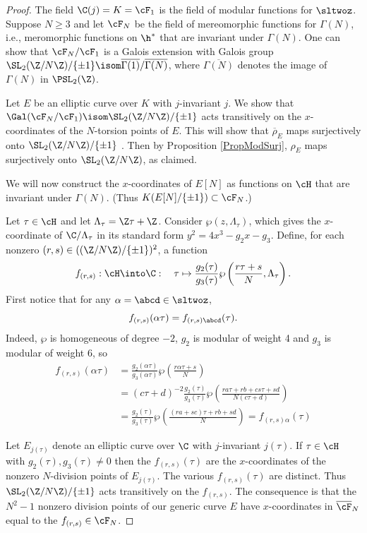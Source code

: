 \documentclass{report}
\begin{document}
\begin{proof}
  The field $\C(j)=K=\cF_1$ is the field of modular functions for
  $\sltwoz$. Suppose $N\geq 3$ and let $\cF_N$ be the field of
  mereomorphic functions for $\Gamma(N)$, i.e., meromorphic functions
  on $\h^*$ that are invariant under $\Gamma(N)$.  One can show that
  $\cF_N/\cF_1$ is a Galois extension with Galois group
  $\SL_2(\Z/N\Z)/\{\pm 1\} \isom
  \overline{\Gamma(1)}/\overline{\Gamma(N)}$, where
  $\overline{\Gamma(N)}$ denotes the image of $\Gamma(N)$ in
  $\PSL_2(\Z)$.

Let $E$ be an elliptic curve over $K$ with $j$-invariant $j$.
We show that $\Gal(\cF_N/\cF_1) \isom \SL_2(\Z/N\Z)/\{\pm 1\}$
acts transitively on the $x$-coordinates of the
$N$-torsion points of $E$. This will show that $\overline{\rho}_E$
maps surjectively onto $\SL_2(\Z/N\Z)/\{\pm 1\}$ . Then by
Proposition \ref{PropModSurj}, $\rho_E$ maps surjectively
onto $\SL_2(\Z/N\Z)$, as claimed.

We will now construct the $x$-coordinates of $E[N]$ as
functions on $\cH$ that are invariant under $\Gamma(N)$.
(Thus $K(E[N]/\{\pm 1\})\subset \cF_N$.)

Let $\tau\in\cH$ and let $\Lambda_{\tau}=\Z\tau+\Z$. Consider
$\wp(z,\Lambda_{\tau})$, which gives the $x$-coordinate of
$\C/\Lambda_{\tau}$ in its standard form
$y^2=4x^3-g_2x-g_3$. Define, for
each nonzero $(r,s)\in((\Z/N\Z)/\{\pm{}1\})^2$, a function
$$f_{(r,s)}:\cH\into\C: \quad \tau\mapsto\frac{g_2(\tau)}{g_3(\tau)}
          \wp\left(\frac{r\tau+s}{N},\Lambda_{\tau}\right).$$
First notice that for any $\alpha=\abcd\in\sltwoz$,
$$f_{(r,s)}(\alpha\tau)=f_{(r,s)\abcd}(\tau).$$
Indeed, $\wp$ is homogeneous of degree $-2$, $g_2$ is modular
of weight 4 and $g_3$ is modular of weight 6, so
\begin{align*}
f_{(r,s)}(\alpha\tau)& =\frac{g_2(\alpha\tau)}{g_3(\alpha\tau)}
                      \wp\left(\frac{r\alpha\tau+s}{N}\right)\\
& = (c\tau+d)^{-2}\frac{g_2(\tau)}{g_3(\tau)}
                      \wp\left(\frac{ra\tau+rb+cs\tau+sd}{N(c\tau+d)}\right)\\
& = \frac{g_2(\tau)}{g_3(\tau)}\wp\left(\frac{(ra+sc)\tau+rb+sd}{N}\right)
  = f_{(r,s)\alpha}(\tau)
\end{align*}

Let $E_{j(\tau)}$ denote an elliptic curve over
$\C$ with $j$-invariant $j(\tau)$.  If $\tau\in\cH$ with $g_2(\tau),
g_3(\tau)\neq 0$ then the $f_{(r,s)}(\tau)$ are the $x$-coordinates of
the nonzero $N$-division points of $E_{j(\tau)}$. The various
$f_{(r,s)}(\tau)$ are distinct. Thus $\SL_2(\Z/N\Z)/\{\pm 1\}$ acts
transitively on the $f_{(r,s)}$. The consequence is that the $N^2-1$
nonzero division points of our generic curve $E$ have $x$-coordinates
in $\overline{\cF}_N$ equal to the $f_{(r,s)}\in\cF_N$.
\end{proof}
\end{document}

